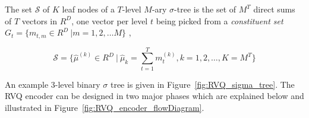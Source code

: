 The set $\mathcal{S}$ of $K$ leaf nodes of a $T$-level $M$-ary $\sigma$-tree is the set of $M^T$ direct sums of $T$ vectors in $R^D$, one vector per level $t$ being picked from a \emph{constituent set} $G_t = \{m_{t,m} \in R^D \ | m=1, 2, \ldots M\}$ \cite{2002_JNL_SigmaTrees_Barnes},

\begin{equation}
\mathcal{S} = \{\hat{\mu}^{(k)} \in R^D \ | \ \hat{\mu}_k = \sum\limits_{t=1}^T m_t^{(k)}, k=1, 2, \ldots, K=M^T\}
\end{equation}

An example 3-level binary $\sigma$ tree is given in Figure~\ref{fig:RVQ_sigma_tree}.  The RVQ encoder can be designed in two major phases which are explained below and illustrated in Figure~\ref{fig:RVQ_encoder_flowDiagram}. 
 


 

